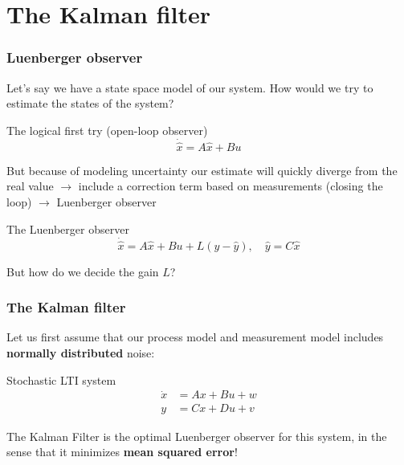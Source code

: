 \documentclass{beamer}
\begin{document}

\section{The Kalman filter}

\begin{frame}
    \frametitle{Luenberger observer}
    Let's say we have a state space model of our system. How would we try to estimate the states of the system? 

    \begin{block}{The logical first try (open-loop observer)}
        \begin{equation}
            \dot{\hat{x}} = A \hat{x} + B u 
        \end{equation}
    \end{block}

    But because of modeling uncertainty our estimate will quickly diverge from the real value $\rightarrow$ include a correction term based on measurements (closing the loop) $\rightarrow$ Luenberger observer

    \begin{block}{The Luenberger observer}
        \begin{equation}
            \dot{\hat{x}} = A \hat{x} + B u + L (y - \hat{y}), \quad \hat{y} = C \hat{x}
        \end{equation}
    \end{block}
    But how do we decide the gain $L$?
\end{frame}


\begin{frame}
    \frametitle{The Kalman filter}
    Let us first assume that our process model and measurement model includes \textbf{normally distributed} noise:
    \begin{block}{Stochastic LTI system}
        \begin{equation}
            \begin{aligned}
                \dot{x} &= A x + B u + w \\
                y &=C x + D u + v
            \end{aligned}
        \end{equation}
    \end{block}
    The Kalman Filter is the optimal Luenberger observer for this system, in the sense that it minimizes \textbf{mean squared error}!
\end{frame}
\end{document}
